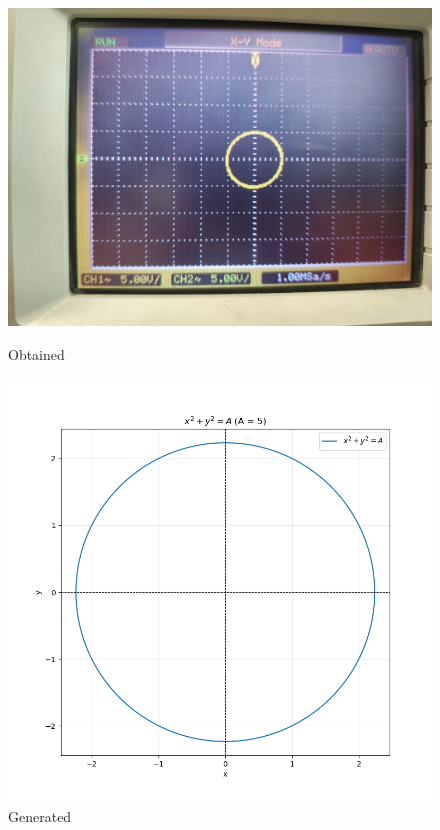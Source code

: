 \documentclass[a4paper,12pt]{article}
\numberwithin{equation}{section} %
\begin{document}
\begin{figure}[htbp]
    \centering
    \begin{minipage}{0.45\textwidth}
        \centering
        \includegraphics[width=\linewidth]{Graphs/Graph2.jpeg}
        \caption{Obtained}
    \end{minipage}
    \hfill
    \begin{minipage}{0.45\textwidth}
        \centering
        \includegraphics[width=\linewidth]{Python plots/lab4.png} 
        \caption{Generated}
    \end{minipage}
\end{figure}
\newpage
\end{document}
